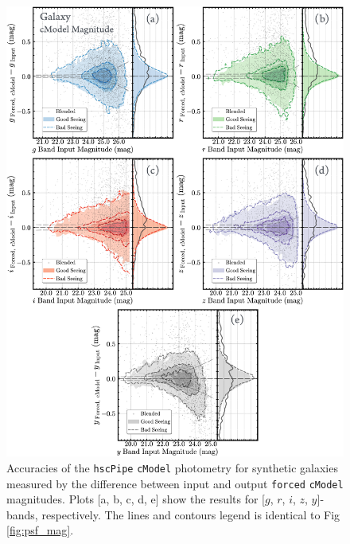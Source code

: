 \documentclass[useamsfonts]{pasj01}
\def\hscpipe{\texttt{hscPipe}}
\def\cmodel{\texttt{cModel}}
\def\forced{\texttt{forced}}
\begin{document}
\begin{figure}
    \begin{center}
        \includegraphics[width=16cm]{fig/synpipe_galaxy_mag}
    \end{center}
    \caption{
        Accuracies of the \hscpipe{} \cmodel{} photometry for synthetic
        galaxies measured by the difference between input and output \forced{}
        \cmodel{} magnitudes.
        Plots [a, b, c, d, e] show the results for [$g$, $r$, $i$, $z$, $y$]-bands, 
        respectively.
        The lines and contours legend is identical to Fig \ref{fig:psf_mag}.
        }
    \label{fig:cmodel_mag}
\end{figure}
\end{document}
